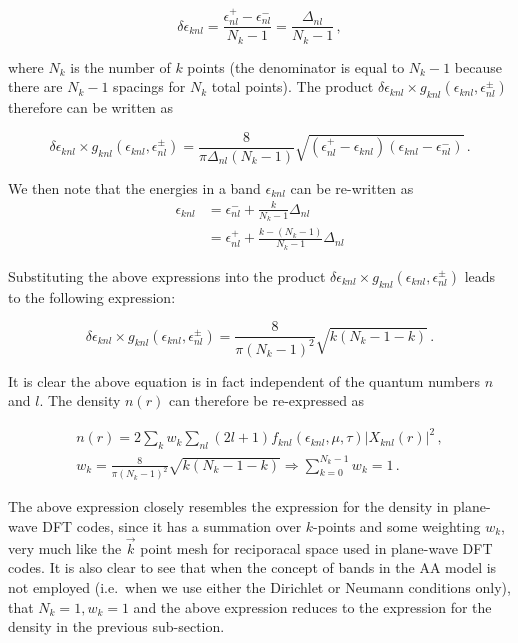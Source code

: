 \documentclass[9pt]{article}
\begin{document}
\begin{equation}
\delta\epsilon_{knl} = \frac{\epsilon^+_{nl} - \epsilon^-_{nl}}{N_k-1} = \frac{\Delta_{nl}}{N_k-1}\,,
\end{equation}

where \(N_k\) is the number of \(k\) points (the denominator is equal to
\(N_k-1\) because there are \(N_k-1\) spacings for \(N_k\) total
points). The product
\(\delta\epsilon_{knl} \times g_{knl}(\epsilon_{knl},\epsilon_{nl}^\pm)\)
therefore can be written as

\begin{equation}
\delta\epsilon_{knl} \times g_{knl}(\epsilon_{knl},\epsilon_{nl}^\pm) = \frac{8}{\pi\Delta_{nl}(N_k-1)} \sqrt{(\epsilon^+_{nl}-\epsilon_{knl})(\epsilon_{knl} - \epsilon^-_{nl})}\,.
\end{equation}

We then note that the energies in a band \(\epsilon_{knl}\) can be
re-written as \begin{align}
\epsilon_{knl} &= \epsilon_{nl}^- + \frac{k}{N_k-1}\Delta_{nl} \\
               &= \epsilon_{nl}^+ + \frac{k-(N_k-1)}{N_k-1}\Delta_{nl}
\end{align}

Substituting the above expressions into the product
\(\delta\epsilon_{knl} \times g_{knl}(\epsilon_{knl},\epsilon_{nl}^\pm)\)
leads to the following expression:

\begin{equation}
\delta\epsilon_{knl} \times g_{knl}(\epsilon_{knl},\epsilon_{nl}^\pm) = \frac{8}{\pi(N_k-1)^2}\sqrt{k(N_k-1-k)}\,.
\end{equation}

It is clear the above equation is in fact independent of the quantum
numbers \(n\) and \(l\). The density \(n(r)\) can therefore be
re-expressed as

\begin{gather}
n(r) = 2\sum_{k} w_k \sum_{nl}(2l+1) f_{knl}(\epsilon_{knl},\mu,\tau) |X_{knl}(r)|^2\,,\\
w_k = \frac{8}{\pi(N_k-1)^2}\sqrt{k(N_k-1-k)} \Rightarrow \sum_{k=0}^{N_k-1} w_k =1\,.
\end{gather}

The above expression closely resembles the expression for the density in
plane-wave DFT codes, since it has a summation over \(k\)-points and
some weighting \(w_k\), very much like the \(\vec{k}\) point mesh for
reciporacal space used in plane-wave DFT codes. It is also clear to see
that when the concept of bands in the AA model is not employed
(i.e.~when we use either the Dirichlet or Neumann conditions only), that
\(N_k=1,w_k=1\) and the above expression reduces to the expression for
the density in the previous sub-section.
\end{document}
